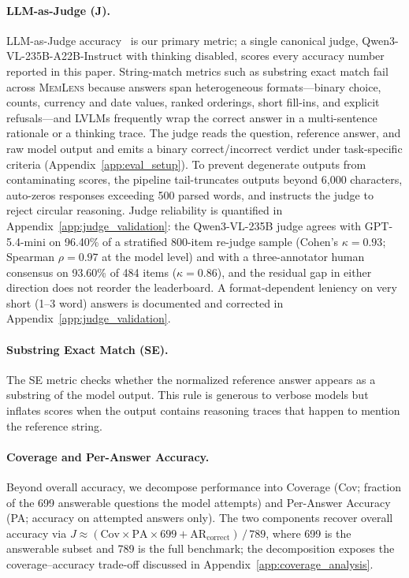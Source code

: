 \documentclass{article}
\newcommand{\bench}{\textsc{MemLens}}
\begin{document}
\paragraph{LLM-as-Judge (J).}
LLM-as-Judge accuracy~\cite{zheng2023judging} is our primary metric; a single canonical judge, Qwen3-VL-235B-A22B-Instruct with thinking disabled, scores every accuracy number reported in this paper.
String-match metrics such as substring exact match fail across \bench{} because answers span heterogeneous formats---binary choice, counts, currency and date values, ranked orderings, short fill-ins, and explicit refusals---and LVLMs frequently wrap the correct answer in a multi-sentence rationale or a thinking trace.
The judge reads the question, reference answer, and raw model output and emits a binary correct/incorrect verdict under task-specific criteria (Appendix~\ref{app:eval_setup}).
To prevent degenerate outputs from contaminating scores, the pipeline tail-truncates outputs beyond 6{,}000 characters, auto-zeros responses exceeding 500 parsed words, and instructs the judge to reject circular reasoning.
Judge reliability is quantified in Appendix~\ref{app:judge_validation}: the Qwen3-VL-235B judge agrees with GPT-5.4-mini on 96.40\% of a stratified 800-item re-judge sample (Cohen's $\kappa = 0.93$; Spearman $\rho = 0.97$ at the model level) and with a three-annotator human consensus on 93.60\% of 484 items ($\kappa = 0.86$), and the residual gap in either direction does not reorder the leaderboard.
A format-dependent leniency on very short (1--3 word) answers is documented and corrected in Appendix~\ref{app:judge_validation}.

\paragraph{Substring Exact Match (SE).}
The SE metric checks whether the normalized reference answer appears as a substring of the model output.
This rule is generous to verbose models but inflates scores when the output contains reasoning traces that happen to mention the reference string.

\paragraph{Coverage and Per-Answer Accuracy.}
Beyond overall accuracy, we decompose performance into Coverage (Cov; fraction of the 699 answerable questions the model attempts) and Per-Answer Accuracy (PA; accuracy on attempted answers only).
The two components recover overall accuracy via $J \approx (\text{Cov} \times \text{PA} \times 699 + \text{AR}_{\text{correct}})\,/\,789$, where 699 is the answerable subset and 789 is the full benchmark; the decomposition exposes the coverage--accuracy trade-off discussed in Appendix~\ref{app:coverage_analysis}.
\end{document}
